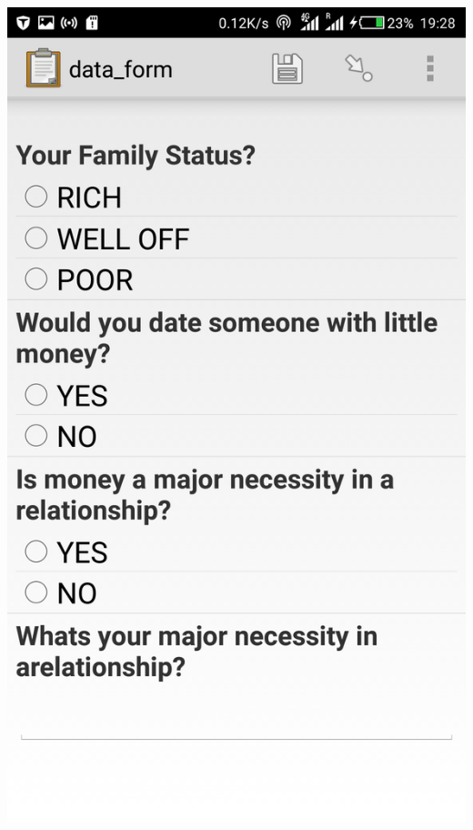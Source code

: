 \documentclass[12pt,letterpaper]{article}
\begin{document}
{				\includegraphics[scale=0.1]{paul2}
}
\end{document}
